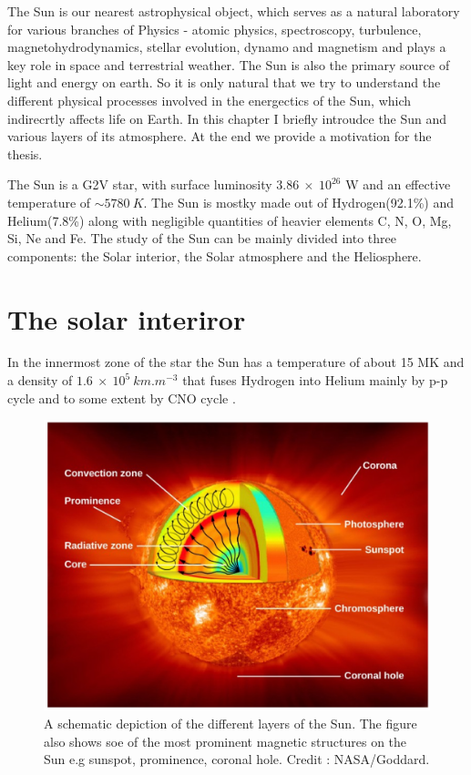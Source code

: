 

The Sun is our nearest astrophysical object, which serves as a natural laboratory for various branches of Physics - atomic physics, spectroscopy, turbulence, magnetohydrodynamics, stellar evolution, dynamo and magnetism and plays a key role in space and terrestrial weather. The Sun is also the primary source of light and energy on earth. So it is only natural that we try to understand the different physical processes involved in the energectics of the Sun, which indirecrtly affects life on Earth. In this chapter I briefly introudce the Sun and various layers of its atmosphere. At the end we provide a motivation for the thesis.

The Sun is a G2V star, with surface luminosity $3.86~\times~10^{26}$ W and an effective temperature of $\sim 5780~K$. The Sun is mostky made out of Hydrogen(92.1\%) and Helium(7.8\%) along with negligible quantities of heavier elements C, N, O, Mg, Si, Ne and Fe. The study of the Sun can be mainly divided into three components: the Solar interior, the Solar atmosphere and the Heliosphere.

\section{The solar interiror}\label{solar_int}

In the innermost zone of the star the Sun has a temperature of about 15 MK and a density of $1.6~\times~10^{5}~km.m^{-3}$ that fuses Hydrogen into Helium mainly by p-p cycle and to some extent by CNO cycle . 

\begin{figure}[h!]
    \centering
    \includegraphics[width = 0.8\linewidth]{Figures/solar_int.png}
    \caption{A schematic depiction of the different layers of the Sun. The figure also shows soe of the most prominent magnetic structures on the Sun e.g sunspot, prominence, coronal hole. Credit : NASA/Goddard. }
    \label{fig_solar_int}
\end{figure}

